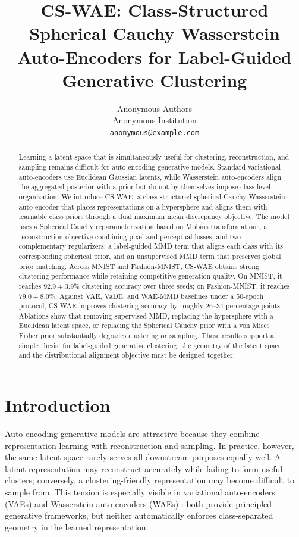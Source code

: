 \documentclass[10pt]{article}
\title{\vspace{-1.0em}
CS-WAE: Class-Structured Spherical Cauchy Wasserstein Auto-Encoders
for Label-Guided Generative Clustering
\vspace{-0.2em}}
\author{
Anonymous Authors\\
\small Anonymous Institution\\
\small \texttt{anonymous@example.com}
}
\date{}
\begin{document}
\maketitle

\begin{abstract}
Learning a latent space that is simultaneously useful for clustering, reconstruction, and sampling remains difficult for auto-encoding generative models. Standard variational auto-encoders use Euclidean Gaussian latents, while Wasserstein auto-encoders align the aggregated posterior with a prior but do not by themselves impose class-level organization. We introduce CS-WAE, a class-structured spherical Cauchy Wasserstein auto-encoder that places representations on a hypersphere and aligns them with learnable class priors through a dual maximum mean discrepancy objective. The model uses a Spherical Cauchy reparameterization based on Mobius transformations, a reconstruction objective combining pixel and perceptual losses, and two complementary regularizers: a label-guided MMD term that aligns each class with its corresponding spherical prior, and an unsupervised MMD term that preserves global prior matching. Across MNIST and Fashion-MNIST, CS-WAE obtains strong clustering performance while retaining competitive generation quality. On MNIST, it reaches $92.9{\pm}3.9\%$ clustering accuracy over three seeds; on Fashion-MNIST, it reaches $79.0{\pm}8.0\%$. Against VAE, VaDE, and WAE-MMD baselines under a 50-epoch protocol, CS-WAE improves clustering accuracy by roughly 26--34 percentage points. Ablations show that removing supervised MMD, replacing the hypersphere with a Euclidean latent space, or replacing the Spherical Cauchy prior with a von Mises--Fisher prior substantially degrades clustering or sampling. These results support a simple thesis: for label-guided generative clustering, the geometry of the latent space and the distributional alignment objective must be designed together.
\end{abstract}

\section{Introduction}

Auto-encoding generative models are attractive because they combine representation learning with reconstruction and sampling. In practice, however, the same latent space rarely serves all downstream purposes equally well. A latent representation may reconstruct accurately while failing to form useful clusters; conversely, a clustering-friendly representation may become difficult to sample from. This tension is especially visible in variational auto-encoders (VAEs) \citep{kingma2013autoencoding} and Wasserstein auto-encoders (WAEs) \citep{tolstikhin2017wasserstein}: both provide principled generative frameworks, but neither automatically enforces class-separated geometry in the learned representation.
\end{document}
